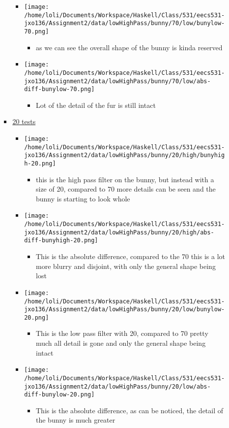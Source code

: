 \documentclass{article}
\begin{document}
\begin{enumerate}
\begin{enumerate}
\begin{itemize}
\begin{itemize}
\begin{itemize}
\end{itemize}
\item \texttt{[image: /home/loli/Documents/Workspace/Haskell/Class/531/eecs531-jxo136/Assignment2/data/lowHighPass/bunny/70/low/bunylow-70.png]}
\begin{itemize}
\item as we can see the overall shape of the bunny is kinda reserved
\end{itemize}
\item \texttt{[image: /home/loli/Documents/Workspace/Haskell/Class/531/eecs531-jxo136/Assignment2/data/lowHighPass/bunny/70/low/abs-diff-bunylow-70.png]}
\begin{itemize}
\item Lot of the detail of the fur is still intact
\end{itemize}
\end{itemize}
\item \uline{20 tests}
\begin{itemize}
\item \texttt{[image: /home/loli/Documents/Workspace/Haskell/Class/531/eecs531-jxo136/Assignment2/data/lowHighPass/bunny/20/high/bunyhigh-20.png]}
\begin{itemize}
\item this is the high pass filter on the bunny, but instead with a
size of 20, compared to 70 more details can be seen and the bunny
is starting to look whole
\end{itemize}
\item \texttt{[image: /home/loli/Documents/Workspace/Haskell/Class/531/eecs531-jxo136/Assignment2/data/lowHighPass/bunny/20/high/abs-diff-bunyhigh-20.png]}
\begin{itemize}
\item This is the absolute difference, compared to the 70 this is a
lot more blurry and disjoint, with only the general shape being lost
\end{itemize}
\item \texttt{[image: /home/loli/Documents/Workspace/Haskell/Class/531/eecs531-jxo136/Assignment2/data/lowHighPass/bunny/20/low/bunylow-20.png]}
\begin{itemize}
\item This is the low pass filter with 20, compared to 70 pretty much
all detail is gone and only the general shape being intact
\end{itemize}
\item \texttt{[image: /home/loli/Documents/Workspace/Haskell/Class/531/eecs531-jxo136/Assignment2/data/lowHighPass/bunny/20/low/abs-diff-bunylow-20.png]}
\begin{itemize}
\item This is the absolute difference, as can be noticed, the detail
of the bunny is much greater
\end{itemize}
\end{itemize}
\end{itemize}
\end{enumerate}
\end{enumerate}
\end{document}
